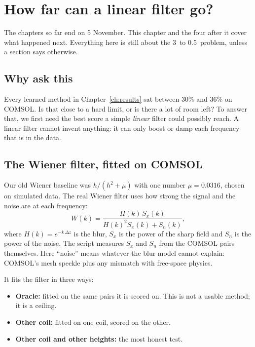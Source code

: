 \chapter{How far can a linear filter go?}\label{ch:floor}

The chapters so far end on 5 November. This chapter and the four after it cover what happened next. Everything here is
still about the 3\um\ to 0.5\um\ problem, unless a section says otherwise.

\section{Why ask this}

Every learned method in Chapter~\ref{ch:results} sat between 30\% and 36\% on COMSOL. Is that close to a hard
limit, or is there a lot of room left? To answer that, we first need the best score a simple \emph{linear} filter could
possibly reach. A linear filter cannot invent anything: it can only boost or damp each frequency that is in the data.

\section{The Wiener filter, fitted on COMSOL}

Our old Wiener baseline was $h/(h^2+\mu)$ with one number $\mu=0.0316$, chosen on simulated data. The real Wiener
filter uses how strong the signal and the noise are at each frequency:
\begin{equation}
W(k) = \frac{H(k)\,S_x(k)}{H(k)^2 S_x(k) + S_n(k)},
\end{equation}
where $H(k)=e^{-k\,\Delta z}$ is the blur, $S_x$ is the power of the sharp field and $S_n$ is the power of the noise.
The script  measures $S_x$ and $S_n$ from the COMSOL pairs themselves. Here ``noise'' means
whatever the blur model cannot explain: COMSOL's mesh speckle plus any mismatch with free-space physics.

It fits the filter in three ways:
\begin{itemize}
\item \textbf{Oracle:} fitted on the same pairs it is scored on. This is not a usable method; it is a ceiling.
\item \textbf{Other coil:} fitted on one coil, scored on the other.
\item \textbf{Other coil and other heights:} the most honest test.
\end{itemize}

